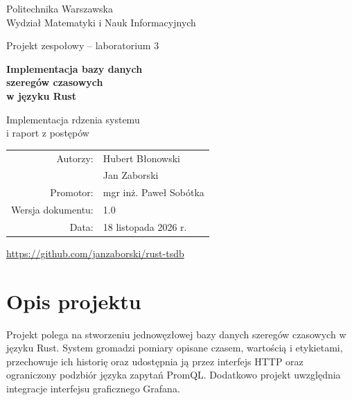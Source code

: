 \documentclass[11pt,a4paper]{article}
\begin{document}
\raggedbottom
\hypersetup{pageanchor=false}
\begin{titlepage}
	\centering
	{\large Politechnika Warszawska\\
		Wydział Matematyki i Nauk Informacyjnych\par}
	\vspace{2.1cm}
	{\Large Projekt zespołowy -- laboratorium 3\par}
	\vspace{1.2cm}
	{\huge\bfseries Implementacja bazy danych\\
		szeregów czasowych\\w języku Rust\par}
	\vspace{1.1cm}
	{\LARGE Implementacja rdzenia systemu\\
		i raport z postępów\par}
	\vspace{1.4cm}
	\begin{tabular}{rl}
		Autorzy:          & Hubert Błonowski       \\ & Jan Zaborski\\[.5em]
		Promotor:         & mgr inż. Paweł Sobótka \\[.5em]
		Wersja dokumentu: & 1.0                    \\
		Data:             & 18 listopada 2026 r.
	\end{tabular}
	\vfill
	\url{https://github.com/janzaborski/rust-tsdb}
	\vspace{.8cm}
\end{titlepage}
\hypersetup{pageanchor=true}


\section*{Opis projektu}
Projekt polega na stworzeniu jednowęzłowej bazy danych szeregów czasowych
w języku Rust. System gromadzi pomiary opisane czasem, wartością i etykietami,
przechowuje ich historię oraz udostępnia ją przez interfejs HTTP oraz ograniczony
podzbiór języka zapytań PromQL. Dodatkowo projekt uwzględnia
integracje interfejsu graficznego Grafana.
\end{document}
